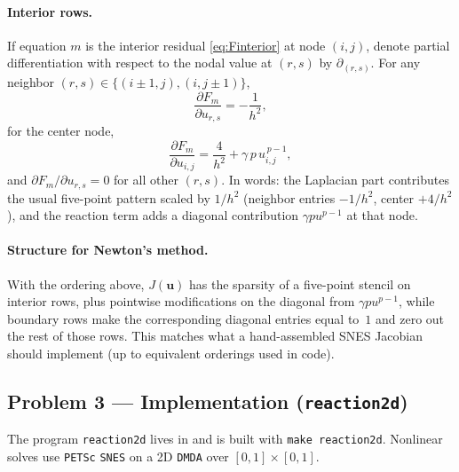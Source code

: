 \documentclass[11pt]{article}
\begin{document}
\paragraph{Interior rows.}
If equation $m$ is the interior residual \eqref{eq:Finterior} at node $(i,j)$, denote partial differentiation with respect to the nodal value at $(r,s)$ by $\partial_{(r,s)}$. For any neighbor $(r,s)\in\{(i\pm1,j),(i,j\pm1)\}$,
\[
  \frac{\partial F_m}{\partial u_{r,s}}
  = -\frac{1}{h^2},
\]
for the center node,
\[
  \frac{\partial F_m}{\partial u_{i,j}}
  = \frac{4}{h^2} + \gamma\, p\, u_{i,j}^{\,p-1},
\]
and $\partial F_m/\partial u_{r,s}=0$ for all other $(r,s)$. In words: the Laplacian part contributes the usual five-point pattern scaled by $1/h^2$ (neighbor entries $-1/h^2$, center $+4/h^2$), and the reaction term adds a diagonal contribution $\gamma p u^{p-1}$ at that node.

\paragraph{Structure for Newton's method.}
With the ordering above, $J(\mathbf{u})$ has the sparsity of a five-point stencil on interior rows, plus pointwise modifications on the diagonal from $\gamma p u^{p-1}$, while boundary rows make the corresponding diagonal entries equal to~$1$ and zero out the rest of those rows. This matches what a hand-assembled SNES Jacobian should implement (up to equivalent orderings used in code).

\subsection*{Problem 3 --- Implementation (\texttt{reaction2d})}

The program \texttt{reaction2d} lives in  and is built with \texttt{make reaction2d}. Nonlinear solves use \texttt{PETSc} \texttt{SNES} on a 2D \texttt{DMDA} over $[0,1]\times[0,1]$.
\end{document}

